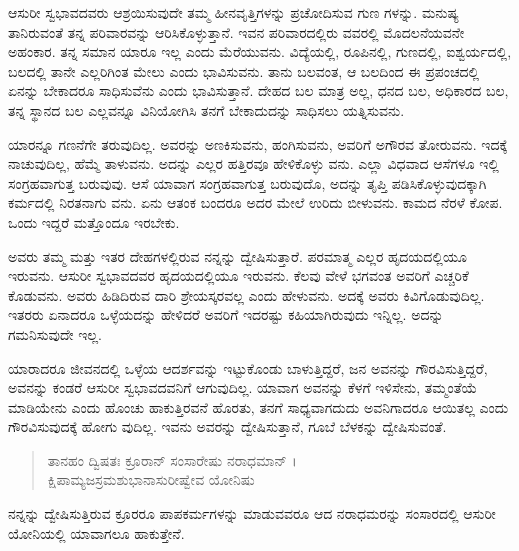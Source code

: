 ಆಸುರೀ ಸ್ವಭಾವದವರು ಆಶ್ರಯಿಸುವುದೇ ತಮ್ಮ ಹೀನವೃತ್ತಿಗಳನ್ನು ಪ್ರಚೋದಿಸುವ ಗುಣ ಗಳನ್ನು. ಮನುಷ್ಯ ತಾನಿರುವಂತೆ ತನ್ನ ಪರಿವಾರವನ್ನು ಆರಿಸಿಕೊಳ್ಳುತ್ತಾನೆ. ಇವನ ಪರಿವಾರದಲ್ಲಿರು ವವರಲ್ಲಿ ಮೊದಲನೆಯವನೇ ಅಹಂಕಾರ. ತನ್ನ ಸಮಾನ ಯಾರೂ ಇಲ್ಲ ಎಂದು ಮೆರೆಯುವನು. ವಿದ್ಯೆಯಲ್ಲಿ, ರೂಪಿನಲ್ಲಿ, ಗುಣದಲ್ಲಿ, ಐಶ್ವರ್ಯದಲ್ಲಿ, ಬಲದಲ್ಲಿ ತಾನೇ ಎಲ್ಲರಿಗಿಂತ ಮೇಲು ಎಂದು ಭಾವಿಸುವನು. ತಾನು ಬಲವಂತ, ಆ ಬಲದಿಂದ ಈ ಪ್ರಪಂಚದಲ್ಲಿ ಏನನ್ನು ಬೇಕಾದರೂ ಸಾಧಿಸುವೆನು ಎಂದು ಭಾವಿಸುತ್ತಾನೆ. ದೇಹದ ಬಲ ಮಾತ್ರ ಅಲ್ಲ, ಧನದ ಬಲ, ಅಧಿಕಾರದ ಬಲ, ತನ್ನ ಸ್ಥಾನದ ಬಲ ಎಲ್ಲವನ್ನೂ ವಿನಿಯೋಗಿಸಿ ತನಗೆ ಬೇಕಾದುದನ್ನು ಸಾಧಿಸಲು ಯತ್ನಿಸುವನು.

ಯಾರನ್ನೂ ಗಣನೆಗೇ ತರುವುದಿಲ್ಲ. ಅವರನ್ನು ಅಣಕಿಸುವನು, ಹಂಗಿಸುವನು, ಅವರಿಗೆ ಅಗೌರವ ತೋರುವನು. ಇದಕ್ಕೆ ನಾಚುವುದಿಲ್ಲ, ಹೆಮ್ಮೆ ತಾಳುವನು. ಅದನ್ನು ಎಲ್ಲರ ಹತ್ತಿರವೂ ಹೇಳಿಕೊಳ್ಳು ವನು. ಎಲ್ಲಾ ವಿಧವಾದ ಆಸೆಗಳೂ ಇಲ್ಲಿ ಸಂಗ್ರಹವಾಗುತ್ತ ಬರುವುವು. ಆಸೆ ಯಾವಾಗ ಸಂಗ್ರಹವಾಗುತ್ತ ಬರುವುದೊ, ಅದನ್ನು ತೃಪ್ತಿ ಪಡಿಸಿಕೊಳ್ಳುವುದಕ್ಕಾಗಿ ಕರ್ಮದಲ್ಲಿ ನಿರತನಾಗು ವನು. ಏನು ಆತಂಕ ಬಂದರೂ ಅದರ ಮೇಲೆ ಉರಿದು ಬೀಳುವನು. ಕಾಮದ ನೆರಳೆ ಕೋಪ. ಒಂದು ಇದ್ದರೆ ಮತ್ತೊಂದೂ ಇರಬೇಕು.

ಅವರು ತಮ್ಮ ಮತ್ತು ಇತರ ದೇಹಗಳಲ್ಲಿರುವ ನನ್ನನ್ನು ದ್ವೇಷಿಸುತ್ತಾರೆ. ಪರಮಾತ್ಮ ಎಲ್ಲರ ಹೃದಯದಲ್ಲಿಯೂ ಇರುವನು. ಆಸುರೀ ಸ್ವಭಾವದವರ ಹೃದಯದಲ್ಲಿಯೂ ಇರುವನು. ಕೆಲವು ವೇಳೆ ಭಗವಂತ ಅವರಿಗೆ ಎಚ್ಚರಿಕೆ ಕೊಡುವನು. ಅವರು ಹಿಡಿದಿರುವ ದಾರಿ ಶ್ರೇಯಸ್ಕರವಲ್ಲ ಎಂದು ಹೇಳುವನು. ಅದಕ್ಕೆ ಅವರು ಕಿವಿಗೊಡುವುದಿಲ್ಲ. ಇತರರು ಏನಾದರೂ ಒಳ್ಳೆಯದನ್ನು ಹೇಳಿದರೆ ಅವರಿಗೆ ಇದರಷ್ಟು ಕಹಿಯಾಗಿರುವುದು ಇನ್ನಿಲ್ಲ. ಅದನ್ನು ಗಮನಿಸುವುದೇ ಇಲ್ಲ.

ಯಾರಾದರೂ ಜೀವನದಲ್ಲಿ ಒಳ್ಳೆಯ ಆದರ್ಶವನ್ನು ಇಟ್ಟುಕೊಂಡು ಬಾಳುತ್ತಿದ್ದರೆ, ಜನ ಅವನನ್ನು ಗೌರವಿಸುತ್ತಿದ್ದರೆ, ಅವನನ್ನು ಕಂಡರೆ ಆಸುರೀ ಸ್ವಭಾವದವನಿಗೆ ಆಗುವುದಿಲ್ಲ. ಯಾವಾಗ ಅವನನ್ನು ಕೆಳಗೆ ಇಳಿಸೇನು, ತಮ್ಮಂತೆಯೆ ಮಾಡಿಯೇನು ಎಂದು ಹೊಂಚು ಹಾಕುತ್ತಿರವನೆ ಹೊರತು, ತನಗೆ ಸಾಧ್ಯವಾಗದುದು ಅವನಿಗಾದರೂ ಆಯಿತಲ್ಲ ಎಂದು ಗೌರವಿಸುವುದಕ್ಕೆ ಹೋಗು ವುದಿಲ್ಲ. ಇವನು ಅವರನ್ನು ದ್ವೇಷಿಸುತ್ತಾನೆ, ಗೂಬೆ ಬೆಳಕನ್ನು ದ್ವೇಷಿಸುವಂತೆ.

\begin{verse}
ತಾನಹಂ ದ್ವಿಷತಃ ಕ್ರೂರಾನ್ ಸಂಸಾರೇಷು ನರಾಧಮಾನ್ ।\\ಕ್ಷಿಪಾಮ್ಯಜಸ್ರಮಶುಭಾನಾಸುರೀಷ್ವೇವ ಯೋನಿಷು 
\end{verse}

{\small ನನ್ನನ್ನು ದ್ವೇಷಿಸುತ್ತಿರುವ ಕ್ರೂರರೂ ಪಾಪಕರ್ಮಗಳನ್ನು ಮಾಡುವವರೂ ಆದ ನರಾಧಮರನ್ನು ಸಂಸಾರದಲ್ಲಿ ಆಸುರೀ ಯೋನಿಯಲ್ಲಿ ಯಾವಾಗಲೂ ಹಾಕುತ್ತೇನೆ.}

